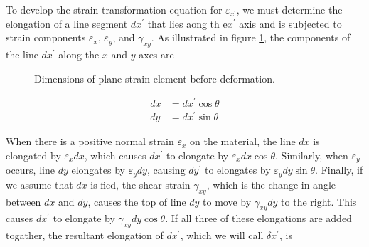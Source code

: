 \documentclass[
10pt,
a4paper,
openany,
svgnames,
]{kaobook} %
\begin{document}
To develop the strain transformation equation for $\varepsilon_{x^\prime }$, we must determine the elongation of a line segment $dx^\prime $ that lies aong th e$x^\prime $ axis and is subjected to strain components $\varepsilon_x$, $\varepsilon_y$, and $\gamma_{xy}$. As illustrated in figure \cref{fig: plane strain before deformation}, the components of the line $dx^\prime $ along the $x$ and $y$ axes are

\begin{figure}[h]
  \centering
  \caption{Dimensions of plane strain element before deformation.}
  \label{fig: plane strain before deformation}
\end{figure}

\begin{align*}
  dx &= dx^\prime  \cos \theta \\
  dy &= dx^\prime  \sin \theta
\end{align*}

When there is a positive normal strain $\varepsilon_x$ on the material, the line $dx$ is elongated by $\varepsilon_x dx$, which causes $dx^\prime $ to elongate by $\varepsilon_x dx \cos \theta$. Similarly, when $\varepsilon_y$ occurs, line $dy$ elongates by $\varepsilon_y dy$, causing $dy^\prime$ to elongates by $\varepsilon_y dy \sin \theta$. Finally, if we assume that $dx$ is fied, the shear strain $\gamma_{xy}$, which is the change in angle between $dx$ and $dy$, causes the top of line $dy$ to move by $\gamma_{xy} dy$ to the right. This causes $dx^\prime $ to elongate by $\gamma_{xy} dy \cos \theta$. If all three of these elongations are added togather, the resultant elongation of $dx^\prime $, which we will call $\delta x^\prime $, is
\end{document}
